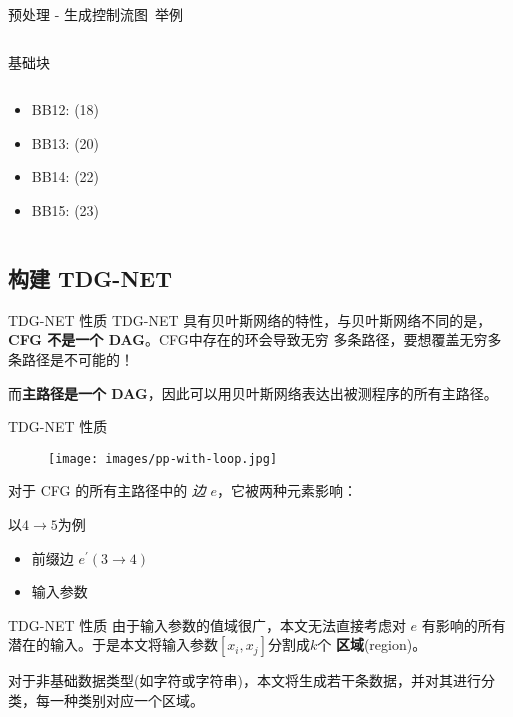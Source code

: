 \documentclass{beamer}
\begin{document}
\begin{frame}{预处理 - 生成控制流图~举例}
\begin{columns}[T]
\begin{column}{.55\textwidth}
\begin{block}{基础块}
\begin{columns}[T]
\begin{column}{.45\textwidth}
\begin{itemize}
                            \item BB12: (18)
                            \item BB13: (20)
                            \item BB14: (22)
                            \item BB15: (23)
                        \end{itemize}
                    \end{column}
                \end{columns}
            \end{block}
        \end{column}
        \end{columns}
    \end{frame}


    \subsection{构建 TDG-NET}
    
    \begin{frame}{TDG-NET 性质}
        \hspace{2em}TDG-NET 具有贝叶斯网络的特性，与贝叶斯网络不同的是，\textbf{CFG 不是一个 DAG}。CFG中存在的环会导致无穷
        多条路径，要想覆盖无穷多条路径是不可能的！

        \hspace{2em}而\textbf{主路径是一个 DAG}，因此可以用贝叶斯网络表达出被测程序的所有主路径。
    \end{frame}

    \begin{frame}{TDG-NET 性质}
        \begin{figure}[t]
            \centering
            \texttt{[image: images/pp-with-loop.jpg]}
        \end{figure}
        对于 CFG 的所有主路径中的 \textit{边} $e$，它被两种元素影响：
        \begin{block}{以$4\rightarrow5$为例}
            \begin{itemize}
                \item 前缀边 $e^\prime(3\rightarrow4)$
                \item 输入参数
            \end{itemize}
        \end{block}
    \end{frame}

    \begin{frame}{TDG-NET 性质}
        由于输入参数的值域很广，本文无法直接考虑对 $e$ 有影响的所有潜在的输入。于是本文将输入参数$[x_i, x_j]$分割成$k$个
        \textbf{区域}(region)。

        \vspace{2em}

        对于非基础数据类型(如字符或字符串)，本文将生成若干条数据，并对其进行分类，每一种类别对应一个区域。
    \end{frame}
    
\end{document}
